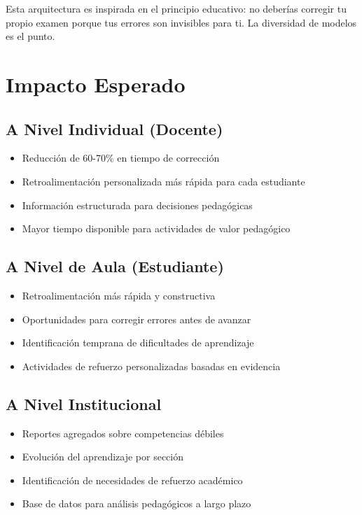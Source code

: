 \documentclass[12pt]{article}
\begin{document}
Esta arquitectura es inspirada en el principio educativo: no deberías corregir tu propio examen porque tus errores son invisibles para ti. La diversidad de modelos es el punto.

\section{Impacto Esperado}

\subsection{A Nivel Individual (Docente)}

\begin{itemize}
    \item Reducción de 60-70\% en tiempo de corrección
    \item Retroalimentación personalizada más rápida para cada estudiante
    \item Información estructurada para decisiones pedagógicas
    \item Mayor tiempo disponible para actividades de valor pedagógico
\end{itemize}

\subsection{A Nivel de Aula (Estudiante)}

\begin{itemize}
    \item Retroalimentación más rápida y constructiva
    \item Oportunidades para corregir errores antes de avanzar
    \item Identificación temprana de dificultades de aprendizaje
    \item Actividades de refuerzo personalizadas basadas en evidencia
\end{itemize}

\subsection{A Nivel Institucional}

\begin{itemize}
    \item Reportes agregados sobre competencias débiles
    \item Evolución del aprendizaje por sección
    \item Identificación de necesidades de refuerzo académico
    \item Base de datos para análisis pedagógicos a largo plazo
\end{itemize}
\end{document}
